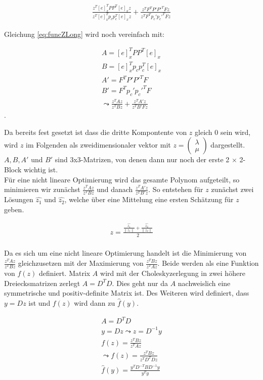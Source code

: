 \begin{gather}
	\frac{z^T[e]_x^TPP^T[e]_xz}{z^T[e]_x^Tp_cp_c^T[e]_xz}+\frac{z^TF^TP'P'^TFz}{z^TF^Tp_c'p_c'^TFz} \label{eq:funcZLong}
\end{gather}

Gleichung \ref{eq:funcZLong} wird noch vereinfach mit:

\begin{gather}
	A = [e]_x^TPP^T[e]_x\\
	B=[e]_x^Tp_cp_c^T[e]_x\\
	A'=F^TP'P'^TF\\
	B'= F^Tp_c'p_c'^TF\\
	\leadsto 
	\frac{z^TAz}{z^TBz}+\frac{z^TA'z}{z^TB'Fz}
\end{gather}
.

Da bereits fest gesetzt ist dass die dritte Kompontente von $z$ gleich 0 sein wird, wird $z$ im Folgenden als zweidimensionaler vektor mit $z = \begin{pmatrix}
\lambda\\ \mu\end{pmatrix}$ dargestellt. $A,B,A'$ und $B'$ sind 3x3-Matrizen, von denen dann nur noch der erste 2 $\times$ 2- Block wichtig ist.\\

Für eine nicht lineare Optimierung wird das gesamte Polynom aufgeteilt, so minimieren wir zunächst $\frac{z^TAz}{z^TBz}$ und danach $\frac{z^TA'z}{z^TB'z}$. So entstehen für $z$ zunächst zwei Lösungen $\hat{z_1}$ und $\hat{z_2}$, welche über eine Mittelung eine ersten Schätzung für $z$ geben\cite{ZZ}.

\begin{gather}
	z = \frac{\frac{\hat{z_1}}{\| z_1 \|}+\frac{\hat{z_2}}{\| z_2 \|}}{2}
\end{gather}\\

Da es sich um eine nicht lineare Optimierung handelt ist die Minimierung von  $\frac{z^TAz}{z^TBz}$ gleichzusetzen mit der Maximierung von  $\frac{z^TBz}{z^TAz}$. Beide werden als eine Funktion von $f(z)$ definiert. Matrix $A$ wird mit der Choleskyzerlegung\cite{FormelsammlungMatrizen} in zwei höhere Dreiecksmatrizen zerlegt $A = D^TD$. Dies geht nur da $A$ nachweislich eine symmetrische und positiv-definite Matrix ist\cite{Fortran77,FormelsammlungMatrizen}. Des Weiteren wird definiert, dass $y = Dz$ ist und $f(z)$ wird dann zu $\hat{f}(y)$\cite{ZZ}.

\begin{gather}
	A = D^TD\\
	y= Dz \leadsto z= D^{-1}y\\
	f(z)= \frac{z^TBz}{z^TAz}\\
	\leadsto 
	f(z)=\frac{z^TBz}{z^TD^TDz}\\
	\hat{f}(y)= \frac{y^TD^{-T}BD^{-1}y}{y^Ty}
\end{gather}

